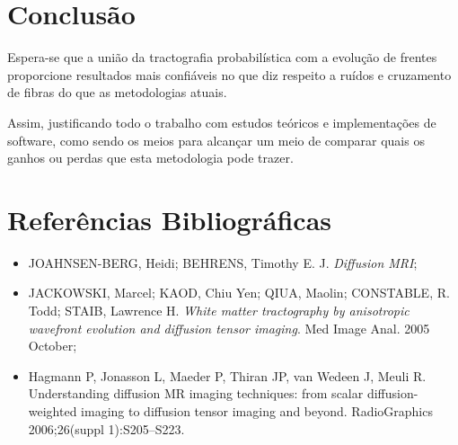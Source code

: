 \documentclass[a4paper,11pt]{report}
\begin{document}
\chapter{Conclusão}
Espera-se que a união da tractografia probabilística com a evolução de frentes proporcione resultados mais confiáveis no que diz respeito a ruídos e cruzamento de fibras do que as metodologias atuais.

Assim, justificando todo o trabalho com estudos teóricos e implementações de software, como sendo os meios para alcançar um meio de comparar quais os ganhos ou perdas que esta metodologia pode trazer.

\chapter{Referências Bibliográficas}

\begin{itemize}
  \item JOAHNSEN-BERG, Heidi; BEHRENS, Timothy E. J. \textit{Diffusion MRI};
  \item JACKOWSKI, Marcel; KAOD, Chiu Yen; QIUA, Maolin; CONSTABLE, R. Todd; STAIB, Lawrence H. \textit{White matter tractography by anisotropic wavefront evolution and diffusion tensor imaging}. Med Image Anal. 2005 October;
  \item Hagmann P, Jonasson L, Maeder P, Thiran JP, van Wedeen J, Meuli R. Understanding diffusion MR imaging techniques: from scalar diffusion-weighted imaging to diffusion tensor imaging and beyond. RadioGraphics 2006;26(suppl 1):S205–S223.
\end{itemize}
\end{document}
